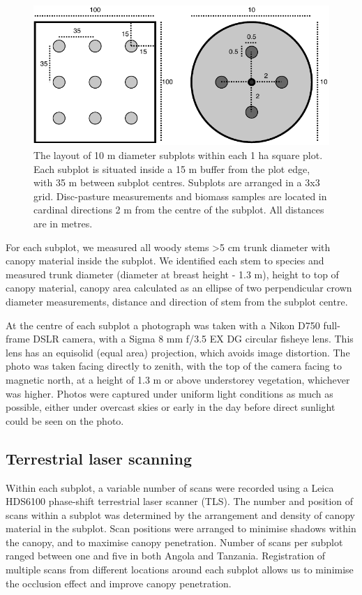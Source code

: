 \documentclass[11pt,a4paper]{article}
\begin{document}
\begin{figure}[H]
\centering
	\includegraphics[width=\textwidth]{subplot}
	\caption{The layout of 10 m diameter subplots within each 1 ha square plot. Each subplot is situated inside a 15 m buffer from the plot edge, with 35 m between subplot centres. Subplots are arranged in a 3x3 grid. Disc-pasture measurements and biomass samples are located in cardinal directions 2 m from the centre of the subplot. All distances are in metres.}
	\label{subplot}
\end{figure}

For each subplot, we measured all woody stems >5 cm trunk diameter with canopy material inside the subplot. We identified each stem to species and measured trunk diameter (diameter at breast height - 1.3 m), height to top of canopy material, canopy area calculated as an ellipse of two perpendicular crown diameter measurements, distance and direction of stem from the subplot centre.

At the centre of each subplot a photograph was taken with a Nikon D750 full-frame DSLR camera, with a Sigma 8 mm f/3.5 EX DG circular fisheye lens. This lens has an equisolid (equal area) projection, which avoids image distortion. The photo was taken facing directly to zenith, with the top of the camera facing to magnetic north, at a height of 1.3 m or above understorey vegetation, whichever was higher. Photos were captured under uniform light conditions as much as possible, either under overcast skies or early in the day before direct sunlight could be seen on the photo. 

\subsection{Terrestrial laser scanning}

Within each subplot, a variable number of scans were recorded using a Leica HDS6100 phase-shift terrestrial laser scanner (TLS). The number and position of scans within a subplot was determined by the arrangement and density of canopy material in the subplot. Scan positions were arranged to minimise shadows within the canopy, and to maximise canopy penetration. Number of scans per subplot ranged between one and five in both Angola and Tanzania. Registration of multiple scans from different locations around each subplot allows us to minimise the occlusion effect and improve canopy penetration.
\end{document}

